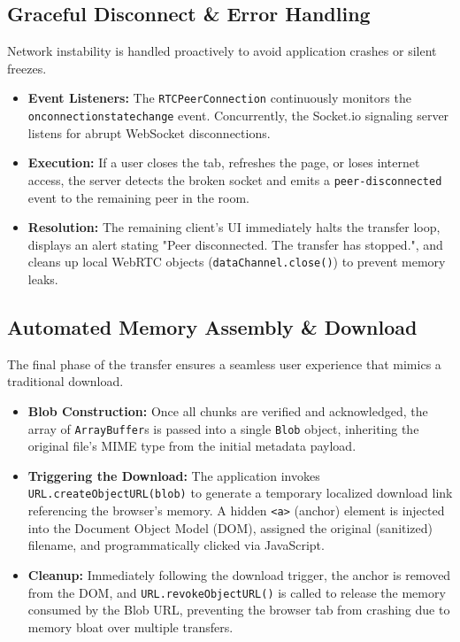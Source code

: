\documentclass[12pt, a4paper]{article}
\begin{document}
\subsection{Graceful Disconnect \& Error Handling}
Network instability is handled proactively to avoid application crashes or silent freezes.
\begin{itemize}
    \item \textbf{Event Listeners:} The \texttt{RTCPeerConnection} continuously monitors the \texttt{onconnectionstatechange} event. Concurrently, the Socket.io signaling server listens for abrupt WebSocket disconnections.
    \item \textbf{Execution:} If a user closes the tab, refreshes the page, or loses internet access, the server detects the broken socket and emits a \texttt{peer-disconnected} event to the remaining peer in the room.
    \item \textbf{Resolution:} The remaining client's UI immediately halts the transfer loop, displays an alert stating "Peer disconnected. The transfer has stopped.", and cleans up local WebRTC objects (\texttt{dataChannel.close()}) to prevent memory leaks.
\end{itemize}

\subsection{Automated Memory Assembly \& Download}
The final phase of the transfer ensures a seamless user experience that mimics a traditional download.
\begin{itemize}
    \item \textbf{Blob Construction:} Once all chunks are verified and acknowledged, the array of \texttt{ArrayBuffer}s is passed into a single \texttt{Blob} object, inheriting the original file's MIME type from the initial metadata payload.
    \item \textbf{Triggering the Download:} The application invokes \texttt{URL.createObjectURL(blob)} to generate a temporary localized download link referencing the browser's memory. A hidden \texttt{<a>} (anchor) element is injected into the Document Object Model (DOM), assigned the original (sanitized) filename, and programmatically clicked via JavaScript.
    \item \textbf{Cleanup:} Immediately following the download trigger, the anchor is removed from the DOM, and \texttt{URL.revokeObjectURL()} is called to release the memory consumed by the Blob URL, preventing the browser tab from crashing due to memory bloat over multiple transfers.
\end{itemize}
\end{document}
